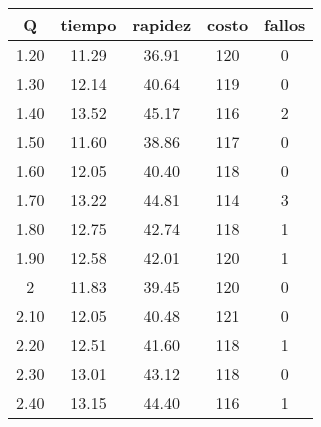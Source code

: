\begin{table}[h!]
\centering
\begin{tabular}{ccccc}
Q & tiempo & rapidez & costo & fallos \\ 
\hline 
1.20 & 11.29 & 36.91 & 120 & 0 \\ 
1.30 & 12.14 & 40.64 & 119 & 0 \\ 
1.40 & 13.52 & 45.17 & 116 & 2 \\ 
1.50 & 11.60 & 38.86 & 117 & 0 \\ 
1.60 & 12.05 & 40.40 & 118 & 0 \\ 
1.70 & 13.22 & 44.81 & 114 & 3 \\ 
1.80 & 12.75 & 42.74 & 118 & 1 \\ 
1.90 & 12.58 & 42.01 & 120 & 1 \\ 
2 & 11.83 & 39.45 & 120 & 0 \\ 
2.10 & 12.05 & 40.48 & 121 & 0 \\ 
2.20 & 12.51 & 41.60 & 118 & 1 \\ 
2.30 & 13.01 & 43.12 & 118 & 0 \\ 
2.40 & 13.15 & 44.40 & 116 & 1 \\ 
\hline 
\end{tabular}
\end{table}